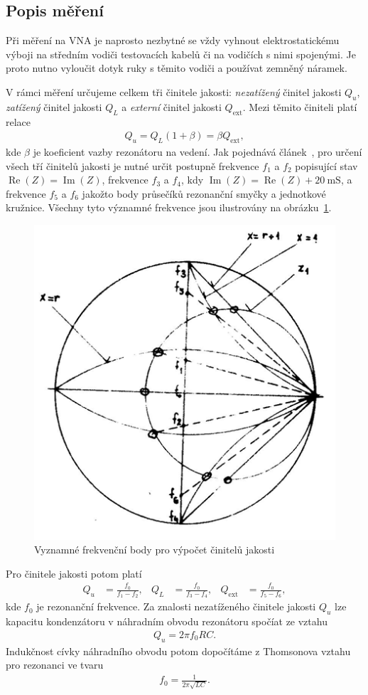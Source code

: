 \documentclass[11pt,a4paper]{article}
\renewcommand{\Re}{\operatorname{Re}}
\renewcommand{\Im}{\operatorname{Im}}
\begin{document}
\subsection*{Popis měření}
Při měření na VNA je naprosto nezbytné se vždy vyhnout elektrostatickému výboji na středním vodiči testovacích kabelů či na vodičích s nimi spojenými. Je proto nutno vyloučit dotyk ruky s těmito vodiči a používat zemněný náramek.

V rámci měření určujeme celkem tři činitele jakosti: \emph{nezatížený} činitel jakosti $Q_u$, \emph{zatížený} činitel jakosti $Q_L$ a \emph{externí} činitel jakosti $Q_{\mathrm{ext}}$. Mezi těmito činiteli platí relace
\begin{align*}
    Q_u = Q_L(1+\beta)=\beta Q_{\mathrm{ext}},
\end{align*}
kde $\beta$ je koeficient vazby rezonátoru na vedení. Jak pojednává článek~\cite{tysl:mereni-pri-velmi-vysokych-kmitoctech}, pro určení všech tří činitelů jakosti je nutné určit postupně frekvence $f_1$ a $f_2$ popisující stav $\Re(Z) = \Im(Z)$, frekvence $f_3$ a $f_4$, kdy $\Im(Z) = \Re(Z) + 20\ \mathrm{mS}$, a frekvence $f_5$ a $f_6$ jakožto body průsečíků rezonanční smyčky a jednotkové kružnice. Všechny tyto významné frekvence jsou ilustrovány na obrázku~\ref{fig:smitak-kruznice}.
\begin{figure}[!ht]
    \centering
    \includegraphics[width=.5\textwidth]{src/smitak-kruznice.png}
    \caption{\label{fig:smitak-kruznice}Vyznamné frekvenční body pro výpočet činitelů jakosti}
\end{figure}
Pro činitele jakosti potom platí
\begin{align}
    Q_u &= \frac{f_0}{f_1-f_2},
    &
    Q_L &= \frac{f_0}{f_3-f_4},
    &
    Q_{\mathrm{ext}} &= \frac{f_0}{f_5-f_6},
\end{align}
kde $f_0$ je rezonanční frekvence. Za znalosti nezatíženého činitele jakosti $Q_u$ lze kapacitu kondenzátoru v náhradním obvodu rezonátoru spočíat ze vztahu
\begin{align}
    Q_u = 2\pi f_0RC.
\end{align}
Indukčnost cívky náhradního obvodu potom dopočítáme z Thomsonova vztahu pro rezonanci ve tvaru
\begin{align}
    f_0 = \frac{1}{2\pi\sqrt{LC}}.
\end{align}
\end{document}
